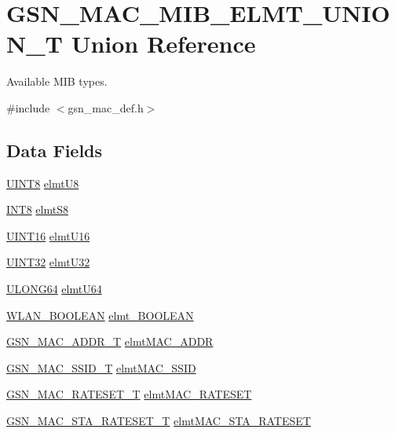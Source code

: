 \hypertarget{a00117}{
\section{GSN\_\-MAC\_\-MIB\_\-ELMT\_\-UNION\_\-T Union Reference}
\label{a00117}
}


Available MIB types.  




{\ttfamily \#include $<$gsn\_\-mac\_\-def.h$>$}

\subsection*{Data Fields}
\begin{DoxyCompactItemize}
\item 
\hyperlink{a00660_gab27e9918b538ce9d8ca692479b375b6a}{UINT8} \hyperlink{a00117_a212ce2e0f176300a69b7faf9970cb219}{elmtU8}
\item 
\hyperlink{a00660_ga307b8734c020247f6bac4fcde0dcfbb9}{INT8} \hyperlink{a00117_a89e9135fc38462f7c5290d75d5f33a2a}{elmtS8}
\item 
\hyperlink{a00660_ga09f1a1fb2293e33483cc8d44aefb1eb1}{UINT16} \hyperlink{a00117_ae59efa07aa6a568360a51505d2feb021}{elmtU16}
\item 
\hyperlink{a00660_gae1e6edbbc26d6fbc71a90190d0266018}{UINT32} \hyperlink{a00117_ad34e843cade6b7b52696608f3aaff89c}{elmtU32}
\item 
\hyperlink{a00660_ga28961430434ccabca6862ea93fe9a15b}{ULONG64} \hyperlink{a00117_ad18a6084bfb610ff42d000f05b3daacf}{elmtU64}
\item 
\hyperlink{a00642_ga7fb691c78d3a1046fa998bae1560e1a5}{WLAN\_\-BOOLEAN} \hyperlink{a00117_afad558afce6af6a1364c46c7410f99dd}{elmt\_\-BOOLEAN}
\item 
\hyperlink{a00416}{GSN\_\-MAC\_\-ADDR\_\-T} \hyperlink{a00117_a4a9f7816e3042da84c6d7574506a6e51}{elmtMAC\_\-ADDR}
\item 
\hyperlink{a00417}{GSN\_\-MAC\_\-SSID\_\-T} \hyperlink{a00117_a9465361f8750cc5ec054d205193d753d}{elmtMAC\_\-SSID}
\item 
\hyperlink{a00125}{GSN\_\-MAC\_\-RATESET\_\-T} \hyperlink{a00117_a247caf80ca60e58173e5a3b9c940087b}{elmtMAC\_\-RATESET}
\item 
\hyperlink{a00132}{GSN\_\-MAC\_\-STA\_\-RATESET\_\-T} \hyperlink{a00117_a3f3bb2394fef3f7acbbe813e36218514}{elmtMAC\_\-STA\_\-RATESET}
\item 

\end{DoxyCompactItemize}
